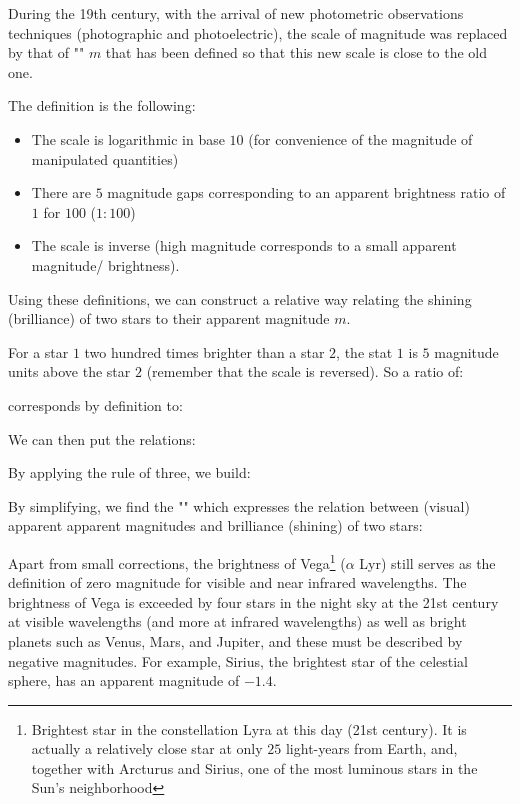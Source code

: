 	During the 19th century, with the arrival of new photometric observations techniques (photographic and photoelectric), the scale of magnitude was replaced by that of "" $m$ that has been defined so that this new scale is close to the old one.

	The definition is the following:
	\begin{itemize}
		\item The scale is logarithmic in base $10$ (for convenience of the magnitude of manipulated quantities)

		\item There are $5$ magnitude gaps corresponding to an apparent brightness ratio of $1$ for $100$ ($1: 100$)

		\item The scale is inverse (high magnitude corresponds to a small apparent magnitude/ brightness).
	\end{itemize}
	Using these definitions, we can construct a relative way relating the shining (brilliance) of two stars to their apparent magnitude $m$.

	For a star $1$ two hundred times brighter than a star $2$, the stat $1$ is $5$ magnitude  units above the star $2$ (remember that the scale is reversed). So a ratio of:
	
	corresponds by definition to:
	
	We can then put the relations:
	
	By applying the rule of three, we build:
	
	By simplifying, we find the "" which expresses the relation between (visual) apparent apparent magnitudes and brilliance (shining) of two stars:
	
	Apart from small corrections, the brightness of Vega\footnote{Brightest star in the constellation Lyra at this day (21st century). It is actually a relatively close star at only $25$ light-years from Earth, and, together with Arcturus and Sirius, one of the most luminous stars in the Sun's neighborhood} ($\alpha$ Lyr) still serves as the definition of zero magnitude for visible and near infrared wavelengths. The brightness of Vega is exceeded by four stars in the night sky at the 21st century at visible wavelengths (and more at infrared wavelengths) as well as bright planets such as Venus, Mars, and Jupiter, and these must be described by negative magnitudes. For example, Sirius, the brightest star of the celestial sphere, has an apparent magnitude of $-1.4$.
	
